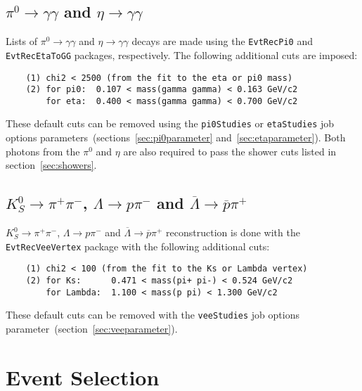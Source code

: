 \documentclass[11pt,a4paper]{define/cepcnote}
\begin{document}
\subsection[$\pi^0\to\gamma\gamma$ and $\eta\to\gamma\gamma$]{\boldmath $\pi^0\to\gamma\gamma$ and $\eta\to\gamma\gamma$}
\label{sec:gg}

Lists of $\pi^0\to\gamma\gamma$ and $\eta\to\gamma\gamma$ decays are made using the {\tt EvtRecPi0} and  {\tt EvtRecEtaToGG} packages, respectively.  The following additional cuts are imposed:

\begin{verbatim}
    (1) chi2 < 2500 (from the fit to the eta or pi0 mass)
    (2) for pi0:  0.107 < mass(gamma gamma) < 0.163 GeV/c2
        for eta:  0.400 < mass(gamma gamma) < 0.700 GeV/c2
\end{verbatim}

These default cuts can be removed using the {\tt pi0Studies} or {\tt etaStudies} job options parameters~(sections~\ref{sec:pi0parameter} and~\ref{sec:etaparameter}).  Both photons from the $\pi^0$ and $\eta$ are also required to pass the shower cuts listed in section~\ref{sec:showers}.


\subsection[$K^0_S \to \pi^+\pi^-$, $\Lambda \to p\pi^-$ and $\overline{\Lambda}\to\overline{p}\pi^+$]{\boldmath $K^0_S \to \pi^+\pi^-$, $\Lambda \to p\pi^-$ and $\overline{\Lambda}\to\overline{p}\pi^+$ }
\label{sec:vee}

$K^0_S \to \pi^+\pi^-$, $\Lambda \to p\pi^-$ and $\overline{\Lambda}\to\overline{p}\pi^+$ reconstruction is done with the {\tt EvtRecVeeVertex} package with the following additional cuts:

\begin{verbatim}
    (1) chi2 < 100 (from the fit to the Ks or Lambda vertex)
    (2) for Ks:      0.471 < mass(pi+ pi-) < 0.524 GeV/c2
        for Lambda:  1.100 < mass(p pi) < 1.300 GeV/c2
\end{verbatim}

These default cuts can be removed with the {\tt veeStudies} job options parameter~(section~\ref{sec:veeparameter}).

\section{Event Selection}
\label{sec:event}
\end{document}
